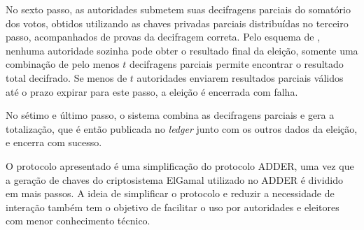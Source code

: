 No sexto passo, as autoridades submetem suas decifragens parciais do somatório
dos votos, obtidos utilizando as chaves privadas parciais distribuídas no
terceiro passo, acompanhados de provas da decifragem correta. Pelo esquema de
\textcite{fouque2000sharing}, nenhuma autoridade sozinha pode obter o resultado
final da eleição, somente uma combinação de pelo menos $t$ decifragens parciais
permite encontrar o resultado total decifrado. Se menos de $t$ autoridades
enviarem resultados parciais válidos até o prazo expirar para este passo, a
eleição é encerrada com falha.

No sétimo e último passo, o sistema combina as decifragens parciais e gera a
totalização, que é então publicada no \textit{ledger} junto com os outros dados
da eleição, e encerra com sucesso.

O protocolo apresentado é uma simplificação do protocolo ADDER, uma vez que a
geração de chaves do criptosistema ElGamal utilizado no ADDER é dividido em
mais passos. A ideia de simplificar o protocolo e reduzir a necessidade de
interação também tem o objetivo de facilitar o uso por autoridades e eleitores
com menor conhecimento técnico.
